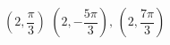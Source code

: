 { $\left( 2, \dfrac{\pi}{3} \right)$  \label{polarpointgraphfirst}}
{$\left( 2, -\dfrac{5\pi}{3} \right), \, \left( 2, \dfrac{7\pi}{3} \right)$\\ }
